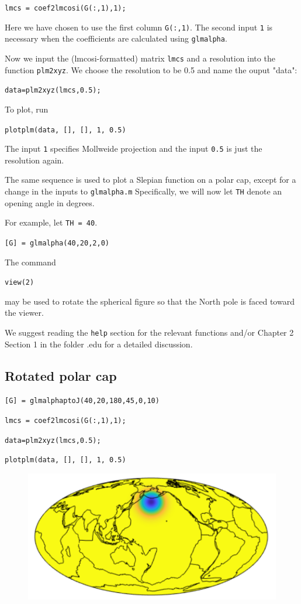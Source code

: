 \documentclass{article}
\begin{document}
\verb!lmcs = coef2lmcosi(G(:,1),1);!

Here we have chosen to use the first column \verb!G(:,1)!. The second input \verb!1! is necessary when the coefficients are calculated using \verb!glmalpha!.

Now we input the (lmcosi-formatted) matrix \verb!lmcs! and a resolution into the function \verb!plm2xyz!. We choose the resolution to be 0.5 and name the ouput "data":

\verb!data=plm2xyz(lmcs,0.5);!

To plot, run

\verb!plotplm(data, [], [], 1, 0.5)!

The input \verb!1! specifies Mollweide projection and the input \verb!0.5! is just the resolution again.

The same sequence is used to plot a Slepian function on a polar cap, except for a change in the inputs to \verb!glmalpha.m! Specifically, we will now let \verb!TH! denote an opening angle in degrees.

For example, let \verb!TH = 40!.

\verb![G] = glmalpha(40,20,2,0)!

The command 

\verb!view(2)!

may be used to rotate the spherical figure so that the North pole is faced toward the viewer.

We suggest reading the \verb!help! section for the relevant functions and/or Chapter 2 Section 1 in the folder .edu for a detailed discussion.

\subsection{Rotated polar cap}

\setlength{\parskip}{.1mm}

\verb![G] = glmalphaptoJ(40,20,180,45,0,10)!

\verb!lmcs = coef2lmcosi(G(:,1),1);!

\verb!data=plm2xyz(lmcs,0.5);!

\verb!plotplm(data, [], [], 1, 0.5)!


\begin{figure}[H]
\includegraphics[scale=.75]{rotated_example}
\end{figure}
\end{document}
